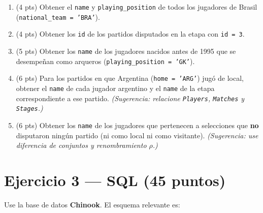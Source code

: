 \documentclass[11pt,a4paper]{article}
\begin{document}
\begin{enumerate}
  \item (4 pts) Obtener el \texttt{name} y \texttt{playing\_position} de todos los jugadores de Brasil (\texttt{national\_team = 'BRA'}).

  \vspace{2.2cm}

  \item (4 pts) Obtener los \texttt{id} de los partidos disputados en la etapa con \texttt{id = 3}.

  \vspace{2.2cm}

  \item (5 pts) Obtener los \texttt{name} de los jugadores nacidos antes de 1995 que se desempeñan como arqueros (\texttt{playing\_position = 'GK'}).

  \vspace{2.5cm}

  \item (6 pts) Para los partidos en que Argentina (\texttt{home = 'ARG'}) jugó de local, obtener el \texttt{name} de cada jugador argentino y el \texttt{name} de la etapa correspondiente a ese partido. \emph{(Sugerencia: relacione \texttt{Players}, \texttt{Matches} y \texttt{Stages}.)}

  \vspace{3cm}

  \item (6 pts) Obtener los \texttt{name} de los jugadores que pertenecen a selecciones que \textbf{no} disputaron ningún partido (ni como local ni como visitante). \emph{(Sugerencia: use diferencia de conjuntos y renombramiento $\rho$.)}

  \vspace{3.5cm}
\end{enumerate}

\newpage

\section*{Ejercicio 3 — SQL \hfill\normalfont(45 puntos)}

Use la base de datos \textbf{Chinook}. El esquema relevante es:
\end{document}
